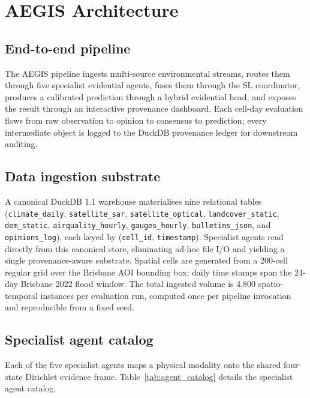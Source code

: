 \section{AEGIS Architecture}\label{sec:architecture}

\subsection{End-to-end pipeline}

The AEGIS pipeline ingests multi-source environmental streams, routes them through five specialist evidential agents, fuses them through the SL coordinator, produces a calibrated prediction through a hybrid evidential head, and exposes the result through an interactive provenance dashboard. Each cell-day evaluation flows from raw observation to opinion to consensus to prediction; every intermediate object is logged to the DuckDB provenance ledger for downstream auditing.

\subsection{Data ingestion substrate}

A canonical DuckDB 1.1 warehouse materialises nine relational tables (\texttt{climate\_daily}, \texttt{satellite\_sar}, \texttt{satellite\_optical}, \texttt{landcover\_static}, \texttt{dem\_static}, \texttt{airquality\_hourly}, \texttt{gauges\_hourly}, \texttt{bulletins\_json}, and \texttt{opinions\_log}), each keyed by (\texttt{cell\_id}, \texttt{timestamp}). Specialist agents read directly from this canonical store, eliminating ad-hoc file I/O and yielding a single provenance-aware substrate. Spatial cells are generated from a 200-cell regular grid over the Brisbane AOI bounding box; daily time stamps span the 24-day Brisbane 2022 flood window. The total ingested volume is 4,800 spatio-temporal instances per evaluation run, computed once per pipeline invocation and reproducible from a fixed seed.

\subsection{Specialist agent catalog}

Each of the five specialist agents maps a physical modality onto the shared four-state Dirichlet evidence frame. Table~\ref{tab:agent_catalog} details the specialist agent catalog.

